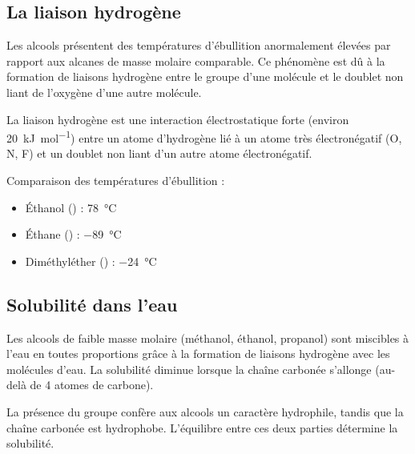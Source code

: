 \subsection{La liaison hydrogène}

\begin{propriete}
Les alcools présentent des températures d'ébullition anormalement élevées par rapport aux alcanes de masse molaire comparable. Ce phénomène est dû à la formation de liaisons hydrogène entre le groupe  d'une molécule et le doublet non liant de l'oxygène d'une autre molécule.
\end{propriete}

\begin{remarque}
La liaison hydrogène est une interaction électrostatique forte (environ \SI{20}{\kilo\joule\per\mol}) entre un atome d'hydrogène lié à un atome très électronégatif (O, N, F) et un doublet non liant d'un autre atome électronégatif.
\end{remarque}

\begin{exemple}
Comparaison des températures d'ébullition :
\begin{itemize}
\item Éthanol () : \SI{78}{\celsius}
\item Éthane () : \SI{-89}{\celsius}
\item Diméthyléther () : \SI{-24}{\celsius}
\end{itemize}
\end{exemple}

\subsection{Solubilité dans l'eau}

\begin{propriete}[Solubilité]
Les alcools de faible masse molaire (méthanol, éthanol, propanol) sont miscibles à l'eau en toutes proportions grâce à la formation de liaisons hydrogène avec les molécules d'eau. La solubilité diminue lorsque la chaîne carbonée s'allonge (au-delà de 4 atomes de carbone).
\end{propriete}

\begin{aretenir}
La présence du groupe  confère aux alcools un caractère hydrophile, tandis que la chaîne carbonée est hydrophobe. L'équilibre entre ces deux parties détermine la solubilité.
\end{aretenir}

